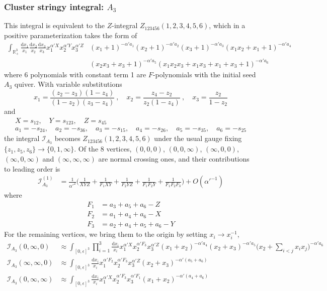 \documentclass[12pt]{article}
\theoremstyle{definition}
\theoremstyle{plain}
\newcommand{\dif}{\mathrm{d}} %
\begin{document}
\subsubsection*{Cluster stringy integral: $A_3$}

This integral is equivalent to the $Z$-integral $Z_{123456}(1,2,3,4,5,6)$, which in a positive parameterization takes the form of 
\begin{align*}
	\int_{\mathbb R_+^3} \frac{\dif x_1}{x_1}\frac{\dif x_2}{x_2}\frac{\dif x_3}{x_3}
	x_1^{\alpha' X}x_2^{\alpha' Y}x_3^{\alpha' Z}
	&(x_1 + 1)^{-\alpha' a_1}
	(x_2 + 1)^{-\alpha'a_2}
	(x_3 + 1)^{-\alpha'a_3}
	(x_1x_2 + x_1 + 1)^{-\alpha'a_4}\\
	&(x_2x_3 + x_3 + 1)^{-\alpha'a_5}
	(x_1x_2x_3 + x_1x_3 + x_1 + x_3 + 1)^{-\alpha'a_6}
\end{align*}
where 6 polynomials with constant term 1 are $F$-polynomials with the initial seed $A_{3}$ quiver. With variable substitutions
\[
x_{1}=\frac{(z_{2}-z_{3})(1-z_{4})}{(1-z_{2})(z_{3}-z_{4})}\:,\quad x_{2}=\frac{z_{4}-z_{2}}{z_{2}(1-z_{4})}\:, \quad
x_{3}=\frac{z_{2}}{1-z_{2}}
\]
and
\begin{gather*}
	X=s_{12},\quad Y=s_{123},\quad Z=s_{45} \\
	a_{1}=-s_{24},\quad a_{2}=-s_{36},\quad a_{3}=-s_{15},\quad a_{4}=-s_{26},\quad a_{5}=-s_{35},\quad a_{6}=-s_{25}	
\end{gather*}
the integral $\mathcal{I}_{A_{3}}$ becomes $Z_{123456}(1,2,3,4,5,6)$ under the usual gauge fixing $\{z_{1},z_{5},z_{6}\}\to\{0,1,\infty\}$. Of the 8 vertices, $(0,0,0)$, $(0,0,\infty)$, $(\infty,0,0)$, $(\infty,0,\infty)$ and $(\infty,\infty,\infty)$ are normal crossing ones, and their contributions to leading order is 
\begin{align*}
	\mathcal{I}_{A_{3}}^{(1)}&=\frac{1}{\alpha'^{2}}\biggl(\frac{1}{XYZ}+\frac{1}{F_{1}XY} +\frac{1}{F_{2}YZ}+\frac{1}{F_{1}F_{2}Y} 
	+\frac{1}{F_{1}F_{2}F_{3}}\biggr) +O(\alpha'^{-1})
\end{align*}	
where
\begin{align*}
	F_{1} &= a_{3}+a_{5}+a_{6}-Z \\
	F_{2} &= a_{1}+a_{4}+a_{6}-X \\
	F_{3} &= a_{2}+a_{4}+a_{5}+a_{6}-Y
\end{align*}
For the remaining vertices, we bring them to the origin by setting $x_{i}\to x_{i}^{-1}$,
\begin{align*}
	\mathcal{I}_{A_{3}}(0,\infty,0)&\approx\int_{[0,\epsilon]^{3}}\prod_{i=1}^{3}\frac{\dif x_{i}}{x_{i}} x_{1}^{\alpha' X}
	x_{2}^{\alpha' F_{3}}x_{3}^{\alpha' Z}(x_{1}+x_{2})^{-\alpha' a_{4}}(x_{2}+x_{3})^{-\alpha' a_{5}}
	\biggl(x_{2}+\sum_{i<j} x_{i}x_{j}\biggr)^{-\alpha' a_{6}} \\
	\mathcal{I}_{A_{3}}(\infty,\infty,0)&\approx \int_{[0,\epsilon]^{3}}\frac{\dif x_{i}}{x_{i}}x_{1}^{\alpha' F_{2}}x_{2}^{\alpha' F_{3}}x_{3}^{\alpha'Z} (x_{2}+x_{3})^{-\alpha'(a_{5}+a_{6})} \\
	\mathcal{I}_{A_{3}}(0,\infty,\infty)&\approx \int_{[0,\epsilon]^{3}}\frac{\dif x_{i}}{x_{i}}x_{1}^{\alpha' X}x_{2}^{\alpha' F_{3}}x_{3}^{\alpha' F_{1}} (x_{1}+x_{2})^{-\alpha'(a_{4}+a_{6})}
\end{align*}
\end{document}
